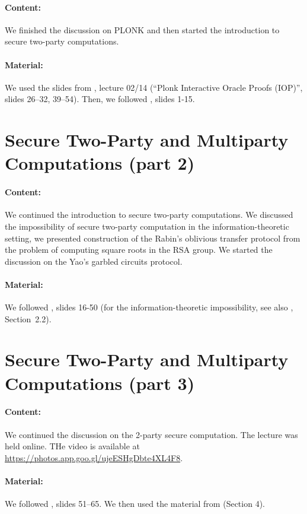\documentclass{llncs}
\begin{document}
\paragraph{Content:} We finished the discussion on PLONK and then started the introduction to secure two-party computations.

\paragraph{Material:}  We used the slides from \cite{ZKlearning}, lecture 02/14 (``Plonk Interactive Oracle Proofs (IOP)'', slides 26--32, 39--54). Then, we followed \cite{2PC}, slides 1-15.


\section{Secure Two-Party and Multiparty Computations (part 2)}


\paragraph{Content:}
We continued the introduction to secure two-party computations. We discussed the impossibility of secure two-party computation in the information-theoretic setting, we presented construction of the Rabin's oblivious transfer protocol from the problem of computing square roots in the RSA group. We started the discussion on the Yao's garbled circuits protocol.

\paragraph{Material:} We followed \cite{2PC}, slides 16-50 (for the information-theoretic impossibility, see also \cite{Wichs17}, Section~2.2).

\section{Secure Two-Party and Multiparty Computations (part 3)}

\paragraph{Content:} We continued the discussion on the 2-party secure computation. The lecture was held online. THe video is available at \url{https://photos.app.goo.gl/ujeESHgDbte4XL4F8}.


\paragraph{Material:} We followed \cite{2PC}, slides 51--65. We then used the material from \cite{Cramer} (Section 4).
\end{document}
